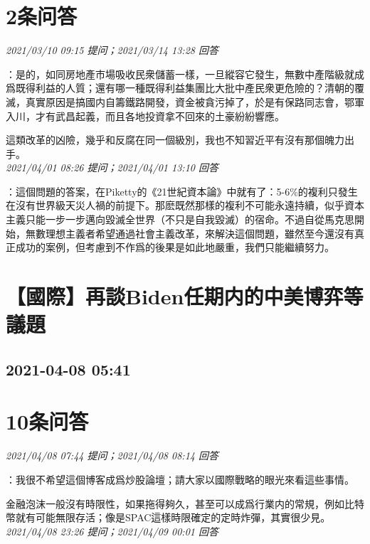 \documentclass[twocolumn]{ctexart}
\begin{document}
\section{2条问答}

\textit{\hfill\noindent\small 2021/03/10 09:15 提问；2021/03/14 13:28 回答}

：是的，如同房地產市場吸收民衆儲蓄一樣，一旦縱容它發生，無數中產階級就成爲既得利益的人質；還有哪一種既得利益集團比大批中產民衆更危險的？清朝的覆滅，真實原因是搞國内自籌鐵路開發，資金被貪污掉了，於是有保路同志會，鄂軍入川，才有武昌起義，而且各地投資拿不回來的土豪紛紛響應。

這類改革的凶險，幾乎和反腐在同一個級別，我也不知習近平有沒有那個魄力出手。
\\

\textit{\hfill\noindent\small 2021/04/01 08:26 提问；2021/04/01 13:10 回答}

：這個問題的答案，在Piketty的《21世紀資本論》中就有了：5-6\%的複利只發生在沒有世界級天災人禍的前提下。那麽既然那樣的複利不可能永遠持續，似乎資本主義只能一步一步邁向毀滅全世界（不只是自我毀滅）的宿命。不過自從馬克思開始，無數理想主義者希望通過社會主義改革，來解決這個問題，雖然至今還沒有真正成功的案例，但考慮到不作爲的後果是如此地嚴重，我們只能繼續努力。
\\


\section{【國際】再談Biden任期内的中美博弈等議題}
\subsection{2021-04-08 05:41}


\section{10条问答}

\textit{\hfill\noindent\small 2021/04/08 07:44 提问；2021/04/08 08:14 回答}

：我很不希望這個博客成爲炒股論壇；請大家以國際戰略的眼光來看這些事情。

金融泡沫一般沒有時限性，如果拖得夠久，甚至可以成爲行業内的常規，例如比特幣就有可能無限存活；像是SPAC這樣時限確定的定時炸彈，其實很少見。
\\

\textit{\hfill\noindent\small 2021/04/08 23:26 提问；2021/04/09 00:01 回答}
\end{document}
